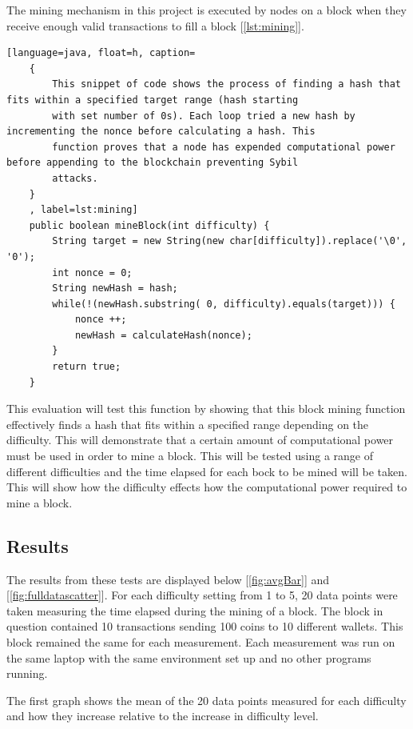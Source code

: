 \documentclass{l4proj}
\begin{document}
The mining mechanism in this project is executed by nodes on a block when they receive enough valid transactions to
fill a block [\ref{lst:mining}].

\begin{lstlisting}[language=java, float=h, caption=
    {
        This snippet of code shows the process of finding a hash that fits within a specified target range (hash starting
        with set number of 0s). Each loop tried a new hash by incrementing the nonce before calculating a hash. This 
        function proves that a node has expended computational power before appending to the blockchain preventing Sybil
        attacks.
    }
    , label=lst:mining]
    public boolean mineBlock(int difficulty) {
        String target = new String(new char[difficulty]).replace('\0', '0');
        int nonce = 0; 
        String newHash = hash;
		while(!(newHash.substring( 0, difficulty).equals(target))) {
            nonce ++;
			newHash = calculateHash(nonce);
        }
        return true;
    }
\end{lstlisting}

This evaluation will test this function by showing that this block mining function effectively finds a hash that fits 
within a specified range depending on the difficulty. This will demonstrate that a certain amount of computational
power must be used in order to mine a block. This will be tested using a range of different difficulties and the time
elapsed for each bock to be mined will be taken. This will show how the difficulty effects how the computational power 
required to mine a block.



\subsection{Results}
The results from these tests are displayed below [\ref{fig:avgBar}] and [\ref{fig:fulldatascatter}]. For each 
difficulty setting from 1 to 5, 20 data points were taken measuring the time elapsed during the mining of
a block. The block in question contained 10 transactions sending 100 coins to 10 different wallets. This block
remained the same for each measurement. Each measurement was run on the same laptop with the same environment
set up and no other programs running.

The first graph shows the mean of the 20 data points measured for each difficulty and how they increase relative
to the increase in difficulty level.
\end{document}
